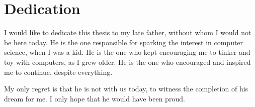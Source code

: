 \chapter{Dedication}
	I would like to dedicate this thesis to my late father, without whom I would not be here today. He is the one responsible for sparking the interest in computer science, when I was a kid. He is the one who kept encouraging me to tinker and toy with computers, as I grew older. He is the one who encouraged and inspired me to continue, despite everything.

	My only regret is that he is not with us today, to witness the completion of his dream for me. I only hope that he would have been proud.